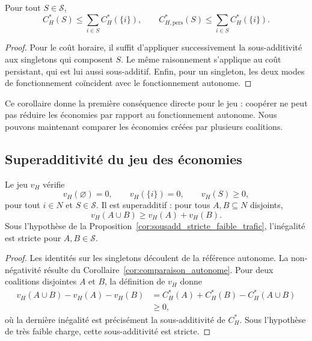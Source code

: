 \begin{corollaire}
\label{cor:comparaison_autonome}
Pour tout \(S\in\mathcal S\),
\[
    C_H^*(S)
    \leqslant
    \sum_{i\in S}C_H^*(\{i\}),
\qquad
    C_{H,\mathrm{pers}}^*(S)
    \leqslant
    \sum_{i\in S}C_H^*(\{i\}).
\]
\end{corollaire}

\begin{proof}
Pour le coût horaire, il suffit d'appliquer successivement la
sous-additivité aux singletons qui composent \(S\). Le même raisonnement
s'applique au coût persistant, qui est lui aussi sous-additif. Enfin, pour un
singleton, les deux modes de fonctionnement coïncident avec le fonctionnement
autonome.
\end{proof}

Ce corollaire donne la première conséquence directe pour le jeu : coopérer ne
peut pas réduire les économies par rapport au fonctionnement autonome. Nous
pouvons maintenant comparer les économies créées par plusieurs coalitions.

\subsection{Superadditivité du jeu des économies}

\begin{proposition}
\label{prop:proprietes_jeu_economies}
\label{prop:proprietes_jeu_fenetre}
Le jeu \(v_H\) vérifie
\[
v_H(\varnothing)=0,\qquad
v_H(\{i\})=0,\qquad
v_H(S)\geqslant0,
\]
pour tout \(i\in N\) et \(S\in\mathcal S\). Il est superadditif : pour tous
\(A,B\subseteq N\) disjoints,
\[
    v_H(A\cup B)\geqslant v_H(A)+v_H(B).
\]
Sous l'hypothèse de la
Proposition~\ref{cor:sousadd_stricte_faible_trafic}, l'inégalité est stricte
pour \(A,B\in\mathcal S\).
\end{proposition}

\begin{proof}
Les identités sur les singletons découlent de la référence autonome. La
non-négativité résulte du Corollaire~\ref{cor:comparaison_autonome}. Pour deux
coalitions disjointes \(A\) et \(B\), la définition de \(v_H\) donne
\[
\begin{aligned}
v_H(A\cup B)-v_H(A)-v_H(B)
&=C_H^*(A)+C_H^*(B)-C_H^*(A\cup B)\\
&\geqslant 0,
\end{aligned}
\]
où la dernière inégalité est précisément la sous-additivité de \(C_H^*\).
Sous l'hypothèse de très faible charge, cette sous-additivité est stricte.
\end{proof}

